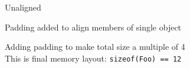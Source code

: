 \begin{frame}
\begin{overprint}
\begin{center}
    \end{center}
  \end{overprint}
  \begin{overprint}
    \begin{center}
      Unaligned
    \end{center}

    \begin{center}
      Padding added to align members of single object
    \end{center}

    \begin{center}
      Adding padding to make total size a multiple of 4 \\
      This is final memory layout: \texttt{sizeof(Foo) == 12} 
    \end{center}
  \end{overprint}
\end{frame}

